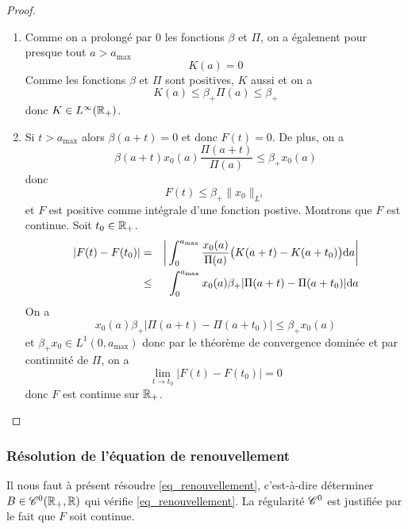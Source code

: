 \begin{proof}
    \begin{enumerate}
        \item Comme on a prolongé par $0$ les fonctions $\beta$ et $\Pi$, on a également pour presque tout $a > a_{\max}$
        \begin{equation*}
            K(a) = 0
        \end{equation*}
        Comme les fonctions $\beta$ et $\Pi$ sont positives, $K$ aussi et on a 
        \begin{equation*}
            K(a) \leq \beta_+ \Pi(a) \leq \beta_+
        \end{equation*}
        donc $K \in L^{\infty}(\mathbb{R}_+)$.
        \item Si $t > a_{\max}$ alors $\beta(a+t) =0$ et donc 
        $F(t)=0$. De plus, on a 
        \begin{equation*}
            \beta(a+t) x_0(a)\frac{\Pi(a+t)}{\Pi(a)} \leq \beta_+x_0(a)
        \end{equation*}
        donc 
        \begin{equation*}
            F(t) \leq \beta_+ \|x_0\|_{L^1}
        \end{equation*}
        et $F$ est positive comme intégrale d'une fonction postive. Montrons que $F$ est continue. Soit $t_0 \in \mathbb{R}_+$.
        \begin{eqnarray*}
            |F(t)-F(t_0)| &=& \bigg|\int_0^{a_{\max}}\frac{x_0(a)}{\Pi(a)}\big(K(a+t)-K(a+t_0)\big)\mathrm{d} a \bigg| \\
            &\leq& \int_0^{a_{\max}} x_0(a)\beta_+|\Pi(a+t)-\Pi(a+t_0)|\mathrm{d} a 
        \end{eqnarray*}
        On a 
        \begin{equation*}
            x_0(a)\beta_+|\Pi(a+t)-\Pi(a+t_0)| \leq \beta_+x_0(a) 
        \end{equation*}
        et $\beta_+x_0 \in L^1(0,a_{\max})$ donc par le théorème de convergence dominée et par continuité de $\Pi$, on a 
        \begin{equation*}
            \lim_{t \to t_0} |F(t)-F(t_0)| = 0
        \end{equation*}
        donc $F$ est continue sur $\mathbb{R}_+$.
    \end{enumerate}
\end{proof}

\subsubsection{Résolution de l'équation de renouvellement}
Il nous faut à présent résoudre \eqref{eq_renouvellement}, c'est-à-dire déterminer $B \in \mathscr{C}^0(\mathbb{R}_+,\mathbb{R})$ qui vérifie \eqref{eq_renouvellement}. La régularité $\mathscr{C}^0$ est justifiée par le fait que $F$ soit continue.

